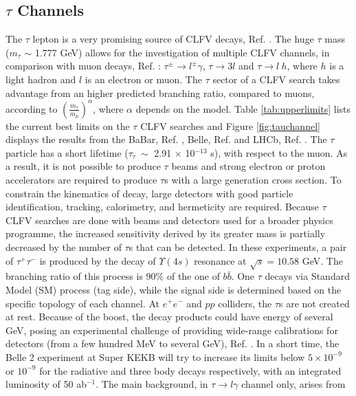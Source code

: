 \subsection{$\tau$ Channels}
The $\tau$ lepton is a very promising source of CLFV decays, Ref. \cite{universe8060299}. 
The huge $\tau$ mass ($m_\tau$ $\sim$ 1.777 GeV) allows for the investigation of multiple CLFV channels, in comparison with muon decays, Ref. \cite{clfv_signorelli}: 
$\tau^\pm \rightarrow l^\pm \gamma$, $\tau \rightarrow 3l$ and $\tau\rightarrow l \ h$, 
where $h$ is a light hadron and $l$ is an electron or muon. The $\tau$ sector of a CLFV search takes advantage from an higher predicted branching ratio, compared to muons, 
according to $(\frac{m_\tau}{m_\mu})^\alpha$, where $\alpha$ depends on the model. Table \ref{tab:upperlimits} lists the current best limits on the $\tau$ 
CLFV searches and Figure \ref{fig:tauchannel} displays the results from the BaBar, Ref. \cite{PhysRevD.77.091104}, Belle, Ref. \cite{ABASHIAN2002117} and LHCb, 
Ref. \cite{TheLHCbCollaboration2008}. The $\tau$ particle has a short lifetime ($\tau_\tau \ \sim$ 2.91 $\times$ 10$^{-13}$ s), with respect to the muon.
As a result, it is not possible to produce $\tau$ beams and strong electron or proton accelerators are required to produce $\tau$s with a large generation cross section. 
To constrain the kinematics of decay, large detectors with good particle identification, tracking, calorimetry, and hermeticity are required. 
Because $\tau$ CLFV searches are done with beams and detectors used for a broader physics programme, 
the increased sensitivity derived by its greater mass is partially decreased by the number of $\tau$s that can be detected.
In these experiments, a pair of $\tau^+ \tau^-$ is produced by the decay of $\Upsilon(4s)$ resonance at $\sqrt{s}=10.58$ GeV. The branching ratio of this process is  $90\%$ of 
the one of $b \bar{b}$. One $\tau$ decays via Standard Model (SM) process (tag side), while the signal side is determined based on the specific topology of each channel. 
At $e^+ e^-$ and $pp$ colliders, the $\tau$s are not created at rest. Because of the boost, the decay products could have 
energy of several GeV, posing an experimental challenge of providing wide-range calibrations for detectors (from a few hundred MeV to several GeV), Ref. \cite{universe8060299}.
In a short time, the Belle 2 experiment at Super KEKB will try to increase its limits below $5 \times 10^{-9}$ or $10^{-9}$ for the radiative and three body decays respectively, 
with an integrated luminosity of 50 ab$^{-1}$. The main background, in $\tau \rightarrow l \gamma$ channel only, arises from
